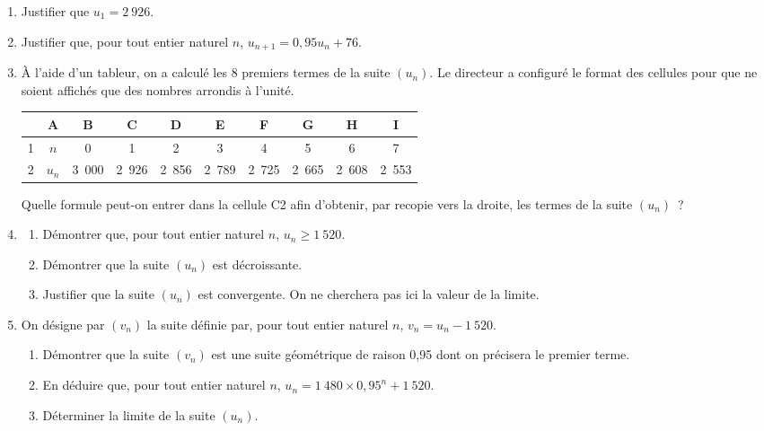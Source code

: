 \begin{enumerate}
     \item
     Justifier que $u_1=2~926$.
     \item Justifier que, pour tout entier naturel $n$, $u_{n+1}=0,95u_n+76$.
     \item À l'aide d'un tableur, on a calculé les 8 premiers termes de la suite $(u_n)$. Le directeur a configuré le format des cellules pour que ne soient affichés que des nombres arrondis à l'unité.
     \begin{center}
\begin{extern}%
               \begin{tabular}{|c|c|c|c|c|c|c|c|c|c|}
               \hline
               \rowcolor{lightgray!20}&A&B&C&D&E&F&G&H&I\\
               \hline
               \cellcolor{lightgray!20}1&$n$&0&1&2&3&4&5&6&7\\
               \hline
               \cellcolor{lightgray!20}2&$u_n$&3~000&2~926&2~856&2~789&2~725&2~665&2~608&2~553\\
               \hline
          \end{tabular}
     \end{extern}
          \end{center}
     Quelle formule peut-on entrer dans la cellule C2 afin d'obtenir, par recopie vers la droite, les termes de la suite $(u_n)$~?
     \item \begin{enumerate}[label=\alph*.]
          \item Démontrer que, pour tout entier naturel $n$, $u_n\geqslant1~520$.
          \item Démontrer que la suite $(u_n)$ est décroissante.
          \item Justifier que la suite $(u_n)$ est convergente. On ne cherchera pas ici la valeur de la limite.
     \end{enumerate}
     \item On désigne par $(v_n)$ la suite définie par, pour tout entier naturel $n$, $v_n=u_n-1~520$.
     \begin{enumerate}[label=\alph*.]
          \item Démontrer que la suite $(v_n)$ est une suite géométrique de raison 0,95 dont on précisera le premier terme.
          \item En déduire que, pour tout entier naturel $n$, $u_n=1~480\times0,95^n+1~520$.
          \item Déterminer la limite de la suite $(u_n)$.

\end{enumerate}
\end{enumerate}
